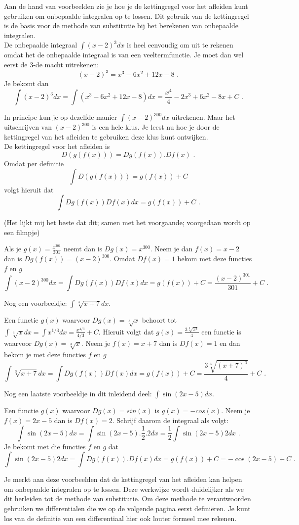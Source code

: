 \documentclass{article}
\begin{document}
Aan de hand van voorbeelden zie je hoe je de kettingregel voor het afleiden kunt gebruiken om onbepaalde integralen op te lossen.
Dit gebruik van de kettingregel is de basis voor de methode van substitutie bij het berekenen van onbepaalde integralen.\\

De onbepaalde integraal $\int (x-2)^3dx$ is heel eenvoudig om uit te rekenen omdat het de onbepaalde integraal is van een veeltermfunctie.
Je moet dan wel eerst de 3-de macht uitrekenen:
\[
(x-2)^3=x^3-6x^2+12x-8 \text { .}
\]
Je bekomt dan
\[
\int (x-2)^3dx=\int (x^3-6x^2+12x-8)dx = \frac{x^4}{4}-2x^3+6x^2-8x+C \text { .}
\]

In principe kun je op dezelfde manier $\int (x-2)^{300}dx$ uitrekenen.
Maar het uitschrijven van $(x-2)^{300}$ is een hele klus.
Je leest nu hoe je door de kettingregel van het afleiden te gebruiken deze klus kunt ontwijken.\\

De kettingregel voor het afleiden is
\[
D(g(f(x)))=Dg(f(x)).Df(x) \text { .}
\]
Omdat per definitie
\[
\int D(g(f(x)))=g(f(x))+C
\]
volgt hieruit dat
\[
\int Dg(f(x))Df(x)dx =g(f(x))+C \text { .}
\]

\noindent (Het lijkt mij het beste dat dit; samen met het voorgaande; voorgedaan wordt op een filmpje)

Als je $g(x)=\frac{x^{301}}{301}$ neemt dan is $Dg(x)=x^{300}$.
Neem je dan $f(x)=x-2$ dan is $Dg(f(x))=(x-2)^{300}$.
Omdat $Df(x)=1$ bekom met deze functies $f$ en $g$
\[
\int (x-2)^{300}dx = \int Dg(f(x))Df(x)dx = g(f(x))+C=\frac{(x-2)^{301}}{301}+C \text { .}
\]

Nog een voorbeeldje: $\int \sqrt[3]{x+7} dx$.

Een functie $g(x)$ waarvoor $Dg(x)=\sqrt[3]{x}$ behoort tot $\int \sqrt[3]{x} dx=\int x^{1/3}dx=\frac{x^{4/3}}{4/3}+C$.
Hieruit volgt dat $g(x)=\frac{3 \sqrt[3]{x^4}}{4}$ een functie is waarvoor $Dg(x)=\sqrt[3 ]{x}$.
Neem je $f(x)=x+7$ dan is $Df(x)=1$ en dan bekom je met deze functies $f$ en $g$
\[
\int \sqrt[3]{x+7}dx=\int Dg(f(x))Df(x)dx = g(f(x))+C=\frac{3\sqrt[3]{(x+7)^4}}{4}+C \text { .}
\]

Nog een laatste voorbeeldje in dit inleidend deel: $\int \sin(2x-5)dx$.

Een functie $g(x)$ waarvoor $Dg(x)=sin(x)$ is $g(x)=-cos(x)$.
Neem je $f(x)=2x-5$ dan is $Df(x)=2$.
Schrijf daarom de integraal als volgt:
\[
\int \sin(2x-5)dx=\int \sin(2x-5).\frac{1}{2}.2dx=\frac{1}{2} \int \sin(2x-5)2dx \text { .}
\]
Je bekomt met die functies $f$ en $g$ dat
\[
\int \sin(2x-5)2dx = \int Dg(f(x)).Df(x)dx=g(f(x))+C=-\cos(2x-5)+C \text { .}
\]
\vspace{2mm}

Je merkt aan deze voorbeelden dat de kettingregel van het afleiden kan helpen om onbepaalde integralen op te lossen.
Deze werkwijze wordt duidelijker als we dit herleiden tot de methode van substitutie.
Om deze methode te verantwoorden gebruiken we differentialen die we op de volgende pagina eerst defini\"eren.
Je kunt los van de definitie van een differentiaal hier ook louter formeel mee rekenen.
\end{document}

